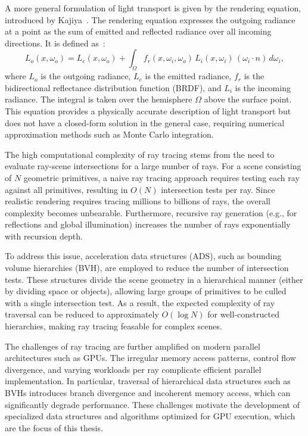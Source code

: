 A more general formulation of light transport is given by the rendering equation, introduced by Kajiya~\cite{K86}. The rendering equation expresses the outgoing radiance at a point as the sum of emitted and reflected radiance over all incoming directions. It is defined as~\cite{K86}:
\begin{equation}
L_o(x, \omega_o) = L_e(x, \omega_o) + \int_{\Omega} f_r(x, \omega_i, \omega_o) \, L_i(x, \omega_i) \, (\omega_i \cdot n) \, d\omega_i,
\end{equation}
where $L_o$ is the outgoing radiance, $L_e$ is the emitted radiance, $f_r$ is the bidirectional reflectance distribution function (BRDF), and $L_i$ is the incoming radiance. The integral is taken over the hemisphere $\Omega$ above the surface point. This equation provides a physically accurate description of light transport but does not have a closed-form solution in the general case, requiring numerical approximation methods such as Monte Carlo integration.~\cite{K86}

The high computational complexity of ray tracing stems from the need to evaluate ray-scene intersections for a large number of rays. For a scene consisting of $N$ geometric primitives, a naive ray tracing approach requires testing each ray against all primitives, resulting in $O(N)$ intersection tests per ray. Since realistic rendering requires tracing millions to billions of rays, the overall complexity becomes unbearable. Furthermore, recursive ray generation (e.g., for reflections and global illumination) increases the number of rays exponentially with recursion depth.

To address this issue, acceleration data structures (ADS), such as bounding volume hierarchies (BVH), are employed to reduce the number of intersection tests. These structures divide the scene geometry in a hierarchical manner (either by dividing space or objects), allowing large groups of primitives to be culled with a single intersection test. As a result, the expected complexity of ray traversal can be reduced to approximately $O(\log N)$ for well-constructed hierarchies, making ray tracing feasable for complex scenes.

The challenges of ray tracing are further amplified on modern parallel architectures such as GPUs. The irregular memory access patterns, control flow divergence, and varying workloads per ray complicate efficient parallel implementation. In particular, traversal of hierarchical data structures such as BVHs introduces branch divergence and incoherent memory access, which can significantly degrade performance. These challenges motivate the development of specialized data structures and algorithms optimized for GPU execution, which are the focus of this thesis.

